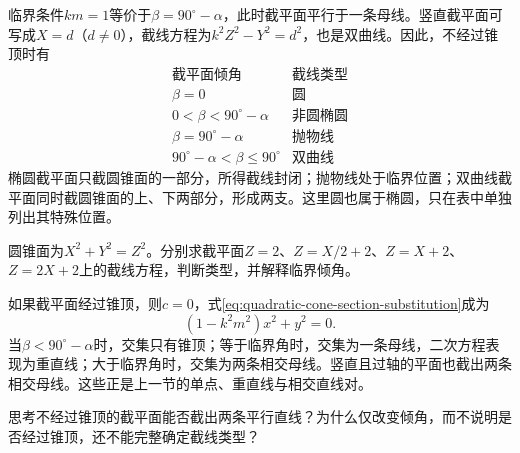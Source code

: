 \newpage
临界条件\(km=1\)等价于\(\beta=90^\circ-\alpha\)，此时截平面平行于一条母线。竖直截平面可写成\(X=d\)（\(d\ne0\)），截线方程为\(k^2Z^2-Y^2=d^2\)，也是双曲线。因此，不经过锥顶时有
\begin{equation}\label{eq:quadratic-section-angle-types}
    \begin{array}{c|c}
        \text{截平面倾角} & \text{截线类型}\\ \hline
        \beta=0 & \text{圆}\\
        0<\beta<90^\circ-\alpha & \text{非圆椭圆}\\
        \beta=90^\circ-\alpha & \text{抛物线}\\
        90^\circ-\alpha<\beta\le90^\circ & \text{双曲线}
    \end{array}
\end{equation}
椭圆截平面只截圆锥面的一部分，所得截线封闭；抛物线处于临界位置；双曲线截平面同时截圆锥面的上、下两部分，形成两支。这里圆也属于椭圆，只在表中单独列出其特殊位置。

\begin{example}
圆锥面为\(X^2+Y^2=Z^2\)。分别求截平面\(Z=2\)、\(Z=X/2+2\)、\(Z=X+2\)、\(Z=2X+2\)上的截线方程，判断类型，并解释临界倾角。
\end{example}

如果截平面经过锥顶，则\(c=0\)，式\eqref{eq:quadratic-cone-section-substitution}成为
\begin{equation*}
    (1-k^2m^2)x^2+y^2=0 .
\end{equation*}
当\(\beta<90^\circ-\alpha\)时，交集只有锥顶；等于临界角时，交集为一条母线，二次方程表现为重直线；大于临界角时，交集为两条相交母线。竖直且过轴的平面也截出两条相交母线。这些正是上一节的单点、重直线与相交直线对。

{\kaiti{}思考\quad 不经过锥顶的截平面能否截出两条平行直线？为什么仅改变倾角，而不说明是否经过锥顶，还不能完整确定截线类型？}

